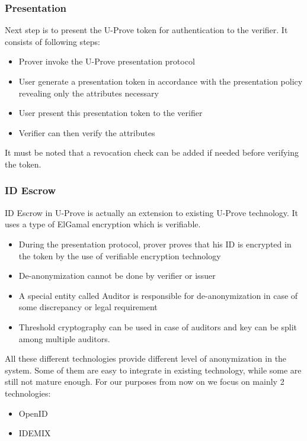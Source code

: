 \subsubsection{Presentation}
Next step is to present the U-Prove token for authentication to the verifier. It consists of following steps:
\begin{itemize}
	\item Prover invoke the U-Prove presentation protocol
	\item User generate a presentation token in accordance with the presentation policy revealing only the attributes necessary
	\item User present this presentation token to the verifier
	\item Verifier can then verify the attributes
\end{itemize}
It must be noted that a revocation check can be added if needed before verifying the token.
\subsubsection{ID Escrow}
ID Escrow in U-Prove is actually an extension to existing U-Prove technology. It uses a type of ElGamal encryption which is verifiable.
\begin{itemize}
	\item  During the presentation protocol, prover proves that his ID is encrypted in the token by the use of verifiable encryption technology
	\item De-anonymization cannot be done by verifier or issuer
	\item A special entity called Auditor is responsible for de-anonymization in case of some discrepancy or legal requirement
	\item Threshold cryptography can be used in case of auditors and key can be split among multiple auditors.
\end{itemize}

All these different technologies provide different level of anonymization in the system. Some of them are easy to integrate in existing technology, while some are still not mature enough. For our purposes from now on we focus on mainly 2 technologies:
\begin{itemize}
	\item OpenID
	\item IDEMIX
\end{itemize}